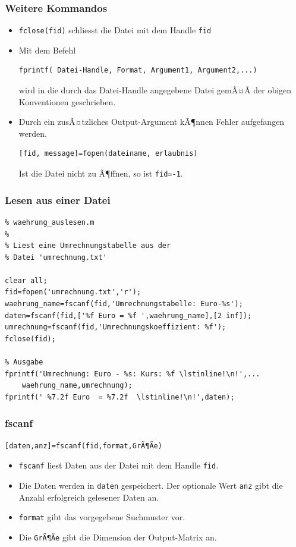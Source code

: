 %
%
\begin{frame}[fragile]\frametitle{Weitere Kommandos}
\begin{itemize}
\item \lstinline!fclose(fid)! schliesst die Datei mit dem Handle \lstinline!fid!
\item Mit dem Befehl
\begin{lstlisting}
fprintf( Datei-Handle, Format, Argument1, Argument2,...)
\end{lstlisting}
wird in die durch das Datei-Handle angegebene Datei gemÃ¤Ã der obigen
Konventionen geschrieben.
\item Durch ein  zusÃ¤tzliches Output-Argument kÃ¶nnen Fehler aufgefangen
  werden. 
\begin{lstlisting}
[fid, message]=fopen(dateiname, erlaubnis)
\end{lstlisting}
Ist  die Datei nicht zu Ã¶ffnen, so ist \lstinline!fid=-1!. 
\end{itemize}
\end{frame}
%
%
\begin{frame}[fragile]\frametitle{Lesen aus einer Datei}
\begin{lstlisting}
% waehrung_auslesen.m
% 
% Liest eine Umrechnungstabelle aus der
% Datei 'umrechnung.txt'

clear all;
fid=fopen('umrechnung.txt','r');
waehrung_name=fscanf(fid,'Umrechnungstabelle: Euro-%s');
daten=fscanf(fid,['%f Euro = %f ',waehrung_name],[2 inf]);
umrechnung=fscanf(fid,'Umrechnungskoeffizient: %f'); 
fclose(fid);
  
% Ausgabe
fprintf('Umrechnung: Euro - %s: Kurs: %f \lstinline!\n!',...
    waehrung_name,umrechnung);
fprintf(' %7.2f Euro  = %7.2f  \lstinline!\n!',daten);
\end{lstlisting}
\end{frame}
%
%
\begin{frame}[fragile]\frametitle{fscanf}
\begin{lstlisting}
[daten,anz]=fscanf(fid,format,GrÃ¶Ãe)
\end{lstlisting}
\begin{itemize}
\item \lstinline!fscanf! liest Daten aus der Datei mit dem Handle
  \lstinline!fid!. 
\item Die Daten werden in \lstinline!daten! gespeichert. Der optionale Wert
  \lstinline!anz! gibt die Anzahl erfolgreich gelesener Daten an.
\item \lstinline!format! gibt das vorgegebene Suchmuster vor.
\item Die \lstinline!GrÃ¶Ãe! gibt die Dimension der Output-Matrix an.
\end{itemize}
\end{frame}
